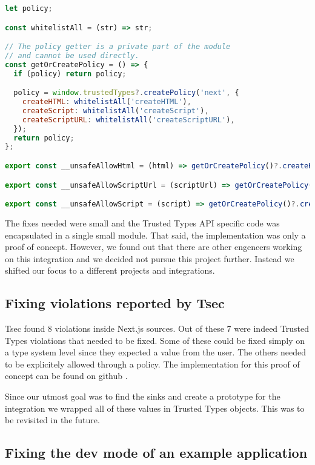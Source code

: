 \bigskip
\begin{lstlisting}[language=JavaScript, caption=Example of Next.js Trusted Types API]
let policy;

const whitelistAll = (str) => str;

// The policy getter is a private part of the module
// and cannot be used directly.
const getOrCreatePolicy = () => {
  if (policy) return policy;

  policy = window.trustedTypes?.createPolicy('next', {
    createHTML: whitelistAll('createHTML'),
    createScript: whitelistAll('createScript'),
    createScriptURL: whitelistAll('createScriptURL'),
  });
  return policy;
};

export const __unsafeAllowHtml = (html) => getOrCreatePolicy()?.createHTML(html) ?? html;

export const __unsafeAllowScriptUrl = (scriptUrl) => getOrCreatePolicy()?.createScriptURL(scriptUrl) ?? scriptUrl;

export const __unsafeAllowScript = (script) => getOrCreatePolicy()?.createScript(script) ?? script;
\end{lstlisting}

The fixes needed were small and the Trusted Types API specific code was encapsulated in a single
small module. That said, the implementation was only a proof of concept. However, we found out that
there are other engeneers working on this integration and we decided not pursue this project
further. Instead we shifted our focus to a different projects and integrations.

\subsection{Fixing violations reported by Tsec}

Tsec found 8 violations \cite{tsec_output} inside Next.js sources. Out of these 7 were indeed
Trusted Types violations that needed to be fixed. Some of these could be fixed simply on a type
system level since they expected a value from the user. The others needed to be explicitely allowed
through a policy. The implementation for this proof of concept can be found on github
\cite{nextjs_fix_tsec_violations_commit}.

Since our utmost goal was to find the sinks and create a prototype for the integration we wrapped
all of these values in Trusted Types objects. This was to be revisited in the future.

\subsection{Fixing the dev mode of an example application}

